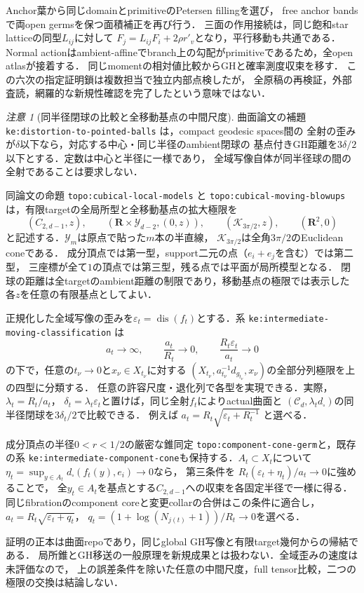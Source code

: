 \documentclass[a4paper,11pt]{ltjsarticle}
\numberwithin{equation}{section}
\theoremstyle{plain}
\theoremstyle{definition}
\theoremstyle{remark}
\newtheorem{remark}[theorem]{注意}
\newcommand{\RR}{\mathbf R}
\newcommand{\cC}{\mathcal C}
\newcommand{\Rt}{R_t}
\begin{document}
Anchor葉から同じdomainとprimitiveのPetersen fillingを選び，
free anchor bandsで両open germsを保つ面積補正を再び行う．
三面の作用接続は，同じ飽和star latticeの同型$L_{ij}$に対して
$F_j=L_{ij}F_i+2\rho r'_v$となり，平行移動も共通である．
Normal actionはambient-affineでbranch上の勾配がprimitiveであるため，全open atlasが接着する．
同じmomentの相対値比較からGHと確率測度収束を移す．
この六次の指定証明鎖は複数担当で独立内部点検したが，
全原稿の再検証，外部査読，網羅的な新規性確認を完了したという意味ではない．

\begin{remark}[同半径閉球の比較と全移動基点の中間尺度]
曲面論文の補題 \texttt{ke:distortion-to-pointed-balls} は，compact geodesic spaces間の
全射の歪みが\(\delta\)以下なら，対応する中心・同じ半径のambient閉球の
基点付きGH距離を\(3\delta/2\)以下とする．定数は中心と半径に一様であり，
全域写像自体が同半径球の間の全射であることは要求しない．

同論文の命題 \texttt{topo:cubical-local-models} と
\texttt{topo:cubical-moving-blowups} は，有限targetの全局所型と全移動基点の拡大極限を
\[
 (C_{2,d-1},z),\qquad
 (\RR\times\mathcal Y_{d-2},(0,z)),\qquad
 (\mathcal K_{3\pi/2},z),\qquad(\RR^2,0)
\]
と記述する．\(\mathcal Y_m\)は原点で貼った\(m\)本の半直線，
\(\mathcal K_{3\pi/2}\)は全角\(3\pi/2\)のEuclidean coneである．
成分頂点では第一型，support二元の点（\(e_i+e_j\)を含む）では第二型，
三座標が全て\(1\)の頂点では第三型，残る点では平面が局所模型となる．
閉球の距離は全targetのambient距離の制限であり，移動基点の極限では表示した
各\(z\)を任意の有限基点としてよい．

正規化した全域写像の歪みを\(\varepsilon_t=\operatorname{dis}(f_t)\)とする．系
\texttt{ke:intermediate-moving-classification} は
\[
 a_t\longrightarrow\infty,\qquad
 \frac{a_t}{\Rt}\longrightarrow0,\qquad
 \frac{\Rt\varepsilon_t}{a_t}\longrightarrow0
\]
の下で，任意の\(t_\nu\to0\)と\(x_\nu\in X_{t_\nu}\)に対する
\((X_{t_\nu},a_{t_\nu}^{-1}d_{g_{t_\nu}},x_\nu)\)の全部分列極限を上の四型に分類する．
任意の許容尺度・退化列で各型を実現できる．実際，\(\lambda_t=\Rt/a_t\)，
\(\delta_t=\lambda_t\varepsilon_t\)と置けば，同じ全射\(f_t\)によりactual曲面と
\((\cC_d,\lambda_t d_\square)\)の同半径閉球を\(3\delta_t/2\)で比較できる．
例えば \(a_t=\Rt\sqrt{\varepsilon_t+\Rt^{-1}}\) と選べる．

成分頂点の半径\(0<r<1/2\)の厳密な錐同定
\texttt{topo:component-cone-germ}と，既存の系
\texttt{ke:intermediate-component-cone}も保持する．\(A_t\subset X_t\)について
\(\eta_t=\sup_{y\in A_t}d_\square(f_t(y),e_i)\to0\)なら，
第三条件を \(\Rt(\varepsilon_t+\eta_t)/a_t\to0\)に強めることで，
全\(y_t\in A_t\)を基点とする\(C_{2,d-1}\)への収束を各固定半径で一様に得る．
同じfibrationのcomponent coreと変更collarの合併はこの条件に適合し，
\(a_t=\Rt\sqrt{\varepsilon_t+q_t}\)，
\(q_t=(1+\log(N_{j(t)}+1))/\Rt\to0\)を選べる．

証明の正本は曲面repoであり，同じglobal GH写像と有限target幾何からの帰結である．
局所錐とGH移送の一般原理を新規成果とは扱わない．全域歪みの速度は未評価なので，
上の誤差条件を除いた任意の中間尺度，full tensor比較，二つの極限の交換は結論しない．
\end{remark}
\end{document}
